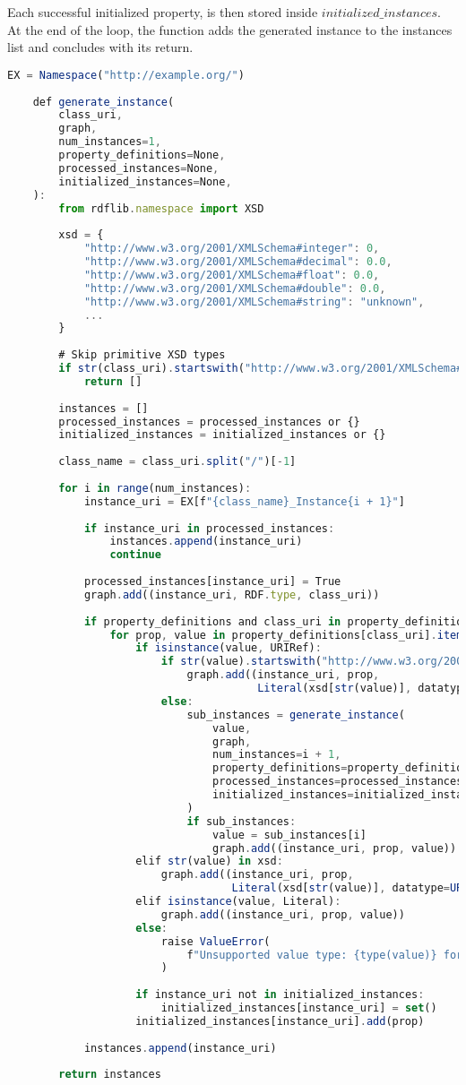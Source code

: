 Each successful initialized property, is then stored inside $initialized\_instances$.
At the end of the loop, the function adds the generated instance to the instances list and concludes with its return.
\begin{lstlisting}[caption={Instance Generation Function}, label={lst:generate_instance}, language=JavaScript]
	EX = Namespace("http://example.org/")
	
	def generate_instance(
		class_uri,
		graph,
		num_instances=1,
		property_definitions=None,
		processed_instances=None,
		initialized_instances=None,
	):
		from rdflib.namespace import XSD
	
		xsd = {
			"http://www.w3.org/2001/XMLSchema#integer": 0,
			"http://www.w3.org/2001/XMLSchema#decimal": 0.0,
			"http://www.w3.org/2001/XMLSchema#float": 0.0,
			"http://www.w3.org/2001/XMLSchema#double": 0.0,
			"http://www.w3.org/2001/XMLSchema#string": "unknown",
			...
		}
	
		# Skip primitive XSD types
		if str(class_uri).startswith("http://www.w3.org/2001/XMLSchema#"):
			return []
	
		instances = []
		processed_instances = processed_instances or {}
		initialized_instances = initialized_instances or {}
	
		class_name = class_uri.split("/")[-1]
	
		for i in range(num_instances):
			instance_uri = EX[f"{class_name}_Instance{i + 1}"]
	
			if instance_uri in processed_instances:
				instances.append(instance_uri)
				continue
	
			processed_instances[instance_uri] = True
			graph.add((instance_uri, RDF.type, class_uri))
	
			if property_definitions and class_uri in property_definitions:
				for prop, value in property_definitions[class_uri].items():
					if isinstance(value, URIRef):
						if str(value).startswith("http://www.w3.org/2001/XMLSchema#"):
							graph.add((instance_uri, prop,
									   Literal(xsd[str(value)], datatype=value)))
						else:
							sub_instances = generate_instance(
								value,
								graph,
								num_instances=i + 1,
								property_definitions=property_definitions,
								processed_instances=processed_instances,
								initialized_instances=initialized_instances
							)
							if sub_instances:
								value = sub_instances[i]
								graph.add((instance_uri, prop, value))
					elif str(value) in xsd:
						graph.add((instance_uri, prop,
								   Literal(xsd[str(value)], datatype=URIRef(value))))
					elif isinstance(value, Literal):
						graph.add((instance_uri, prop, value))
					else:
						raise ValueError(
							f"Unsupported value type: {type(value)} for property {prop}"
						)
	
					if instance_uri not in initialized_instances:
						initialized_instances[instance_uri] = set()
					initialized_instances[instance_uri].add(prop)
	
			instances.append(instance_uri)
	
		return instances
\end{lstlisting}

